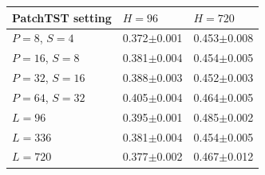 \begin{tabular}{@{}lll@{}}
\toprule
PatchTST setting & $H{=}96$ & $H{=}720$ \\
\midrule
$P{=}8$, $S{=}4$ & 0.372$\pm$0.001 & 0.453$\pm$0.008 \\
$P{=}16$, $S{=}8$ & 0.381$\pm$0.004 & 0.454$\pm$0.005 \\
$P{=}32$, $S{=}16$ & 0.388$\pm$0.003 & 0.452$\pm$0.003 \\
$P{=}64$, $S{=}32$ & 0.405$\pm$0.004 & 0.464$\pm$0.005 \\
\midrule
$L{=}96$ & 0.395$\pm$0.001 & 0.485$\pm$0.002 \\
$L{=}336$ & 0.381$\pm$0.004 & 0.454$\pm$0.005 \\
$L{=}720$ & 0.377$\pm$0.002 & 0.467$\pm$0.012 \\
\bottomrule
\end{tabular}